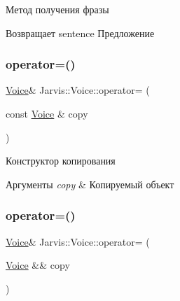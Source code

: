 Метод получения фразы 

\begin{DoxyReturn}{Возвращает}
sentence Предложение 
\end{DoxyReturn}
\mbox{\label{classJarvis_1_1Voice_ab90791a6daeab735274366ca8ce69da2}} 
\subsubsection{\texorpdfstring{operator=()}{operator=()}\hspace{0.1cm}{\footnotesize\ttfamily [1/2]}}
{\footnotesize\ttfamily \hyperlink{classJarvis_1_1Voice}{Voice}\& Jarvis\+::\+Voice\+::operator= (\begin{DoxyParamCaption}\item[{const \hyperlink{classJarvis_1_1Voice}{Voice} \&}]{copy }\end{DoxyParamCaption})\hspace{0.3cm}{\ttfamily [default]}}



Конструктор копирования 


\begin{DoxyParams}{Аргументы}
{\em copy} & Копируемый объект \\
\hline
\end{DoxyParams}
\mbox{\label{classJarvis_1_1Voice_a16477e744cf7f448f10d5bf37644ed15}} 
\subsubsection{\texorpdfstring{operator=()}{operator=()}\hspace{0.1cm}{\footnotesize\ttfamily [2/2]}}
{\footnotesize\ttfamily \hyperlink{classJarvis_1_1Voice}{Voice}\& Jarvis\+::\+Voice\+::operator= (\begin{DoxyParamCaption}\item[{\hyperlink{classJarvis_1_1Voice}{Voice} \&\&}]{copy }\end{DoxyParamCaption})\hspace{0.3cm}{\ttfamily [default]}}



